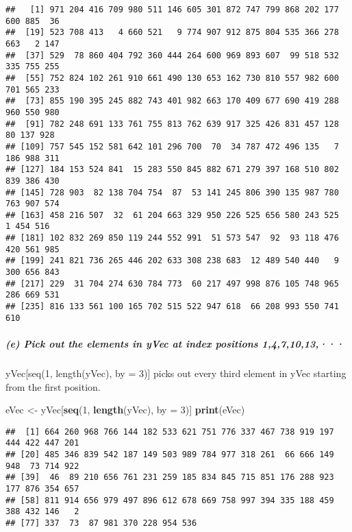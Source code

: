 \documentclass[
]{article}
\newenvironment{Shaded}{\begin{snugshade}}{\end{snugshade}}
\newcommand{\AttributeTok}[1]{\textcolor[rgb]{0.13,0.29,0.53}{#1}}
\newcommand{\DecValTok}[1]{\textcolor[rgb]{0.00,0.00,0.81}{#1}}
\newcommand{\FunctionTok}[1]{\textcolor[rgb]{0.13,0.29,0.53}{\textbf{#1}}}
\newcommand{\NormalTok}[1]{#1}
\newcommand{\OtherTok}[1]{\textcolor[rgb]{0.56,0.35,0.01}{#1}}
\begin{document}
\begin{verbatim}
##   [1] 971 204 416 709 980 511 146 605 301 872 747 799 868 202 177 600 885  36
##  [19] 523 708 413   4 660 521   9 774 907 912 875 804 535 366 278 663   2 147
##  [37] 529  78 860 404 792 360 444 264 600 969 893 607  99 518 532 335 755 255
##  [55] 752 824 102 261 910 661 490 130 653 162 730 810 557 982 600 701 565 233
##  [73] 855 190 395 245 882 743 401 982 663 170 409 677 690 419 288 960 550 980
##  [91] 782 248 691 133 761 755 813 762 639 917 325 426 831 457 128  80 137 928
## [109] 757 545 152 581 642 101 296 700  70  34 787 472 496 135   7 186 988 311
## [127] 184 153 524 841  15 283 550 845 882 671 279 397 168 510 802 839 386 430
## [145] 728 903  82 138 704 754  87  53 141 245 806 390 135 987 780 763 907 574
## [163] 458 216 507  32  61 204 663 329 950 226 525 656 580 243 525   1 454 516
## [181] 102 832 269 850 119 244 552 991  51 573 547  92  93 118 476 420 561 985
## [199] 241 821 736 265 446 202 633 308 238 683  12 489 540 440   9 300 656 843
## [217] 229  31 704 274 630 784 773  60 217 497 998 876 105 748 965 286 669 531
## [235] 816 133 561 100 165 702 515 522 947 618  66 208 993 550 741 610
\end{verbatim}

\subparagraph{(e) Pick out the elements in yVec at index positions
1,4,7,10,13,···}\label{e-pick-out-the-elements-in-yvec-at-index-positions-1471013}

yVec{[}seq(1, length(yVec), by = 3){]} picks out every third element in
yVec starting from the first position.

\begin{Shaded}
\begin{Highlighting}[]
\NormalTok{eVec }\OtherTok{\textless{}{-}}\NormalTok{ yVec[}\FunctionTok{seq}\NormalTok{(}\DecValTok{1}\NormalTok{, }\FunctionTok{length}\NormalTok{(yVec), }\AttributeTok{by =} \DecValTok{3}\NormalTok{)]}
\FunctionTok{print}\NormalTok{(eVec)}
\end{Highlighting}
\end{Shaded}

\begin{verbatim}
##  [1] 664 260 968 766 144 182 533 621 751 776 337 467 738 919 197 444 422 447 201
## [20] 485 346 839 542 187 149 503 989 784 977 318 261  66 666 149 948  73 714 922
## [39]  46  89 210 656 761 231 259 185 834 845 715 851 176 288 923 177 876 354 657
## [58] 811 914 656 979 497 896 612 678 669 758 997 394 335 188 459 388 432 146   2
## [77] 337  73  87 981 370 228 954 536
\end{verbatim}
\end{document}

